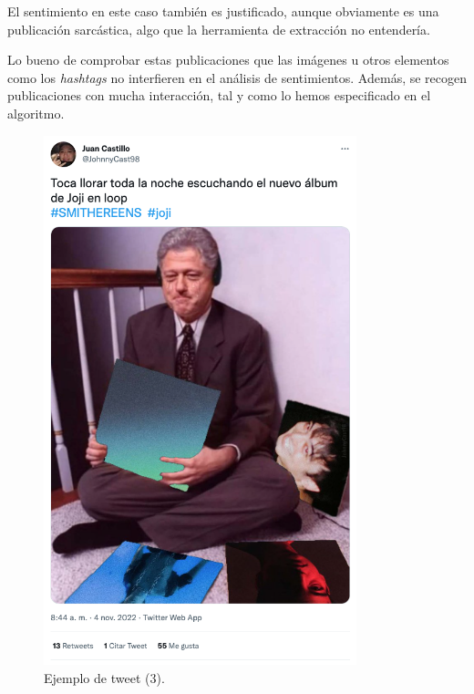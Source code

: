 \vspace{0.3cm}

El sentimiento en este caso también es justificado, aunque obviamente es una publicación sarcástica, algo que la herramienta de extracción no entendería.

\vspace{0.3cm}

Lo bueno de comprobar estas publicaciones que las imágenes u otros elementos como los \textit{hashtags} no interfieren en el análisis de sentimientos. Además, se recogen publicaciones con mucha interacción, tal y como lo hemos especificado en el algoritmo.

\vspace{0.1cm}

\begin{figure}[H]
    \centering
    \myfloatalign
    \includegraphics[width=0.81\textwidth]{gfx/twit3.png}
    \caption[Ejemplo de tweet (3)]{Ejemplo de tweet (3).}\label{gfx:twit3}
\end{figure}

